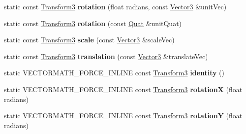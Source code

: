 \begin{DoxyCompactItemize}
static const \hyperlink{classVectormath_1_1Aos_1_1Transform3}{Transform3} {\bfseries rotation} (float radians, const \hyperlink{classVectormath_1_1Aos_1_1Vector3}{Vector3} \&unit\+Vec)
\item 
\mbox{\label{classVectormath_1_1Aos_1_1Transform3_a8cc596ee13b48e5b2b64ef4b850ffdbe}} 
static const \hyperlink{classVectormath_1_1Aos_1_1Transform3}{Transform3} {\bfseries rotation} (const \hyperlink{classVectormath_1_1Aos_1_1Quat}{Quat} \&unit\+Quat)
\item 
\mbox{\label{classVectormath_1_1Aos_1_1Transform3_addf914e08cbf7d27d34ed1e13179b59e}} 
static const \hyperlink{classVectormath_1_1Aos_1_1Transform3}{Transform3} {\bfseries scale} (const \hyperlink{classVectormath_1_1Aos_1_1Vector3}{Vector3} \&scale\+Vec)
\item 
\mbox{\label{classVectormath_1_1Aos_1_1Transform3_ac7e35311a45e92647c35247063bcf7a4}} 
static const \hyperlink{classVectormath_1_1Aos_1_1Transform3}{Transform3} {\bfseries translation} (const \hyperlink{classVectormath_1_1Aos_1_1Vector3}{Vector3} \&translate\+Vec)
\item 
\mbox{\label{classVectormath_1_1Aos_1_1Transform3_a94254a31d1cca57ab1a7a2ef186a6759}} 
static V\+E\+C\+T\+O\+R\+M\+A\+T\+H\+\_\+\+F\+O\+R\+C\+E\+\_\+\+I\+N\+L\+I\+NE const \hyperlink{classVectormath_1_1Aos_1_1Transform3}{Transform3} {\bfseries identity} ()
\item 
\mbox{\label{classVectormath_1_1Aos_1_1Transform3_aac1a34d0b1093fe18a8df1ae1c3af04e}} 
static V\+E\+C\+T\+O\+R\+M\+A\+T\+H\+\_\+\+F\+O\+R\+C\+E\+\_\+\+I\+N\+L\+I\+NE const \hyperlink{classVectormath_1_1Aos_1_1Transform3}{Transform3} {\bfseries rotationX} (float radians)
\item 
\mbox{\label{classVectormath_1_1Aos_1_1Transform3_a3c07b66c2ec540b4a813542988b625e9}} 
static V\+E\+C\+T\+O\+R\+M\+A\+T\+H\+\_\+\+F\+O\+R\+C\+E\+\_\+\+I\+N\+L\+I\+NE const \hyperlink{classVectormath_1_1Aos_1_1Transform3}{Transform3} {\bfseries rotationY} (float radians)
\item 
\mbox{\label{classVectormath_1_1Aos_1_1Transform3_a233abcc5abac075585415de5a868d399}} 

\end{DoxyCompactItemize}
